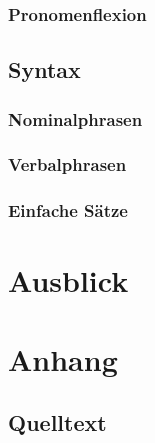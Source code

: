 \documentclass[12pt,abstract=on]{scrreprt}
\begin{document}
\subsection{Pronomenflexion}

\pagebreak
\section{Syntax}
\subsection{Nominalphrasen}
\subsection{Verbalphrasen}
\subsection{Einfache Sätze}
\pagebreak
\chapter{Ausblick}
\pagebreak
%
\printbibliography
\pagebreak
\chapter*{Anhang}
\section*{Quelltext}
%
\end{document}
